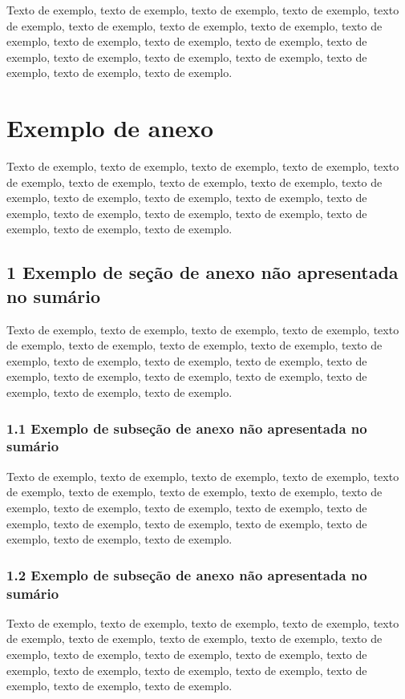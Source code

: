 \documentclass[
	12pt,				%
	oneside,			%
	a4paper,			%
	english,			%
	brazil				%
	]{abntex2ppgsi}
\begin{document}
\begin{anexosenv}
Texto de exemplo, texto de exemplo, texto de exemplo, texto de exemplo, texto de exemplo, texto de exemplo, texto de exemplo, texto de exemplo, texto de exemplo, texto de exemplo, texto de exemplo, texto de exemplo, texto de exemplo, texto de exemplo, texto de exemplo, texto de exemplo, texto de exemplo, texto de exemplo, texto de exemplo.

\chapter{Exemplo de anexo}

Texto de exemplo, texto de exemplo, texto de exemplo, texto de exemplo, texto de exemplo, texto de exemplo, texto de exemplo, texto de exemplo, texto de exemplo, texto de exemplo, texto de exemplo, texto de exemplo, texto de exemplo, texto de exemplo, texto de exemplo, texto de exemplo, texto de exemplo, texto de exemplo, texto de exemplo.

\section*{1 Exemplo de seção de anexo não apresentada no sumário}

Texto de exemplo, texto de exemplo, texto de exemplo, texto de exemplo, texto de exemplo, texto de exemplo, texto de exemplo, texto de exemplo, texto de exemplo, texto de exemplo, texto de exemplo, texto de exemplo, texto de exemplo, texto de exemplo, texto de exemplo, texto de exemplo, texto de exemplo, texto de exemplo, texto de exemplo.

\subsection*{1.1 Exemplo de subseção de anexo não apresentada no sumário}

Texto de exemplo, texto de exemplo, texto de exemplo, texto de exemplo, texto de exemplo, texto de exemplo, texto de exemplo, texto de exemplo, texto de exemplo, texto de exemplo, texto de exemplo, texto de exemplo, texto de exemplo, texto de exemplo, texto de exemplo, texto de exemplo, texto de exemplo, texto de exemplo, texto de exemplo.

\subsection*{1.2 Exemplo de subseção de anexo não apresentada no sumário}

Texto de exemplo, texto de exemplo, texto de exemplo, texto de exemplo, texto de exemplo, texto de exemplo, texto de exemplo, texto de exemplo, texto de exemplo, texto de exemplo, texto de exemplo, texto de exemplo, texto de exemplo, texto de exemplo, texto de exemplo, texto de exemplo, texto de exemplo, texto de exemplo, texto de exemplo.


\end{anexosenv}
\end{document}
